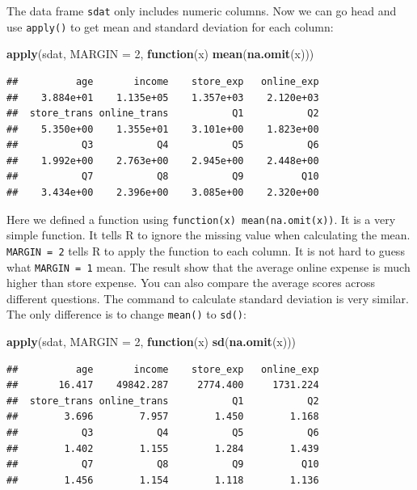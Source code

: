 \documentclass[12pt,]{krantz}
\makeatletter
\newenvironment{Shaded}{\begin{snugshade}}{\end{snugshade}}
\newcommand{\ControlFlowTok}[1]{\textcolor[rgb]{0.27,0.27,0.27}{\textbf{#1}}}
\newcommand{\DataTypeTok}[1]{\textcolor[rgb]{0.27,0.27,0.27}{#1}}
\newcommand{\DecValTok}[1]{\textcolor[rgb]{0.06,0.06,0.06}{#1}}
\newcommand{\KeywordTok}[1]{\textcolor[rgb]{0.27,0.27,0.27}{\textbf{#1}}}
\newcommand{\NormalTok}[1]{#1}
\newenvironment{kframe}{%
\medskip{}
\setlength{\fboxsep}{.8em}
 \def\at@end@of@kframe{}%
 \ifinner\ifhmode%
  \def\at@end@of@kframe{\end{minipage}}%
  \begin{minipage}{\columnwidth}%
 \fi\fi%
 \def\FrameCommand##1{\hskip\@totalleftmargin \hskip-\fboxsep
 \colorbox{shadecolor}{##1}\hskip-\fboxsep
     \hskip-\linewidth \hskip-\@totalleftmargin \hskip\columnwidth}%
 \MakeFramed {\advance\hsize-\width
   \@totalleftmargin\z@ \linewidth\hsize
   \@setminipage}}%
 {\par\unskip\endMakeFramed%
 \at@end@of@kframe}
\renewenvironment{Shaded}{\begin{kframe}}{\end{kframe}}
\makeatother
\begin{document}
The data frame \texttt{sdat} only includes numeric columns. Now we can go head and use \texttt{apply()} to get mean and standard deviation for each column:

\begin{Shaded}
\begin{Highlighting}[]
\KeywordTok{apply}\NormalTok{(sdat, }\DataTypeTok{MARGIN =} \DecValTok{2}\NormalTok{, }\ControlFlowTok{function}\NormalTok{(x) }\KeywordTok{mean}\NormalTok{(}\KeywordTok{na.omit}\NormalTok{(x)))}
\end{Highlighting}
\end{Shaded}

\begin{verbatim}
##          age       income    store_exp   online_exp 
##    3.884e+01    1.135e+05    1.357e+03    2.120e+03 
##  store_trans online_trans           Q1           Q2 
##    5.350e+00    1.355e+01    3.101e+00    1.823e+00 
##           Q3           Q4           Q5           Q6 
##    1.992e+00    2.763e+00    2.945e+00    2.448e+00 
##           Q7           Q8           Q9          Q10 
##    3.434e+00    2.396e+00    3.085e+00    2.320e+00
\end{verbatim}

Here we defined a function using \texttt{function(x)\ mean(na.omit(x))}. It is a very simple function. It tells R to ignore the missing value when calculating the mean. \texttt{MARGIN\ =\ 2} tells R to apply the function to each column. It is not hard to guess what \texttt{MARGIN\ =\ 1} mean. The result show that the average online expense is much higher than store expense. You can also compare the average scores across different questions. The command to calculate standard deviation is very similar. The only difference is to change \texttt{mean()} to \texttt{sd()}:

\begin{Shaded}
\begin{Highlighting}[]
\KeywordTok{apply}\NormalTok{(sdat, }\DataTypeTok{MARGIN =} \DecValTok{2}\NormalTok{, }\ControlFlowTok{function}\NormalTok{(x) }\KeywordTok{sd}\NormalTok{(}\KeywordTok{na.omit}\NormalTok{(x)))}
\end{Highlighting}
\end{Shaded}

\begin{verbatim}
##          age       income    store_exp   online_exp 
##       16.417    49842.287     2774.400     1731.224 
##  store_trans online_trans           Q1           Q2 
##        3.696        7.957        1.450        1.168 
##           Q3           Q4           Q5           Q6 
##        1.402        1.155        1.284        1.439 
##           Q7           Q8           Q9          Q10 
##        1.456        1.154        1.118        1.136
\end{verbatim}
\end{document}
